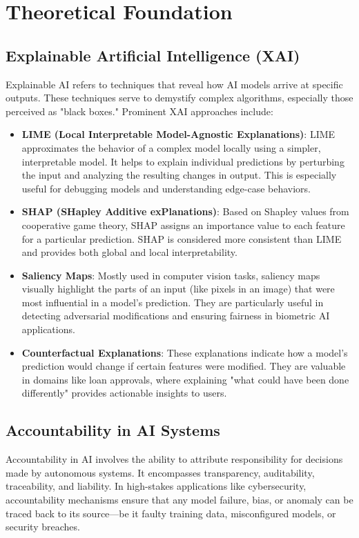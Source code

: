\documentclass[12pt]{article}
\begin{document}
\section{Theoretical Foundation}

\subsection{Explainable Artificial Intelligence (XAI)}
Explainable AI refers to techniques that reveal how AI models arrive at specific outputs. These techniques serve to demystify complex algorithms, especially those perceived as "black boxes." Prominent XAI approaches include:

\begin{itemize}[noitemsep]
  \item \textbf{LIME (Local Interpretable Model-Agnostic Explanations)}: LIME approximates the behavior of a complex model locally using a simpler, interpretable model. It helps to explain individual predictions by perturbing the input and analyzing the resulting changes in output. This is especially useful for debugging models and understanding edge-case behaviors.

  \item \textbf{SHAP (SHapley Additive exPlanations)}: Based on Shapley values from cooperative game theory, SHAP assigns an importance value to each feature for a particular prediction. SHAP is considered more consistent than LIME and provides both global and local interpretability.

  \item \textbf{Saliency Maps}: Mostly used in computer vision tasks, saliency maps visually highlight the parts of an input (like pixels in an image) that were most influential in a model's prediction. They are particularly useful in detecting adversarial modifications and ensuring fairness in biometric AI applications.

  \item \textbf{Counterfactual Explanations}: These explanations indicate how a model's prediction would change if certain features were modified. They are valuable in domains like loan approvals, where explaining "what could have been done differently" provides actionable insights to users.
\end{itemize}

\subsection{Accountability in AI Systems}
Accountability in AI involves the ability to attribute responsibility for decisions made by autonomous systems. It encompasses transparency, auditability, traceability, and liability. In high-stakes applications like cybersecurity, accountability mechanisms ensure that any model failure, bias, or anomaly can be traced back to its source—be it faulty training data, misconfigured models, or security breaches.
\end{document}
